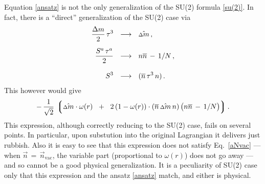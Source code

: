 \documentclass[12pt]{article}
\newcommand{\ov}{\overline}
\newcommand{\lgr}{\left\lgroup}
\newcommand{\rgr}{\right\rgroup}
\newcommand{\nbar}{\ov{n}}
\newcommand{\nnbar}{n\ov{n}}
\newcommand{\dm}{\hat{{\scriptstyle \Delta} m}}
\begin{document}
	Equation \eqref{ansatz} is not the only generalization of the SU(2) formula \eqref{su(2)}.
	In fact, there is a ``direct'' generalization of the SU(2) case via
\begin{align}
%
\notag
	\frac{\Delta m}{2}\, \tau^3    & ~~\longrightarrow~~    \dm\,,\\[2mm]
%
	\frac{S^a\, \tau^a}{2}    & ~~\longrightarrow~~    \nnbar \,-\, 1/N \,,\\[3mm]
%
\notag
	S^3    & ~~\longrightarrow~~     (\nbar\, \tau^3\, n)\,.
\end{align}
	This however would give
\[
	-\, \frac{1}{\sqrt{2}}\, \lgr  \dm \cdot \omega(r)  \;~+~\;  
	2\, ( 1 - \omega(r) ) \cdot (\nbar\, \dm\, n) \, \big( \nnbar \,-\, 1/N \big) \rgr.
\]
	This expression, although correctly reducing to the SU(2) case, fails on several points.
	In particular, upon substution into the original Lagrangian it delivers just rubbish.
	Also it is easy to see that this expression does not satisfy Eq.~\eqref{aNvac} ---
	when $ \vec{n} \,=\, \vec{n}_\text{vac} $, the variable part (proportional to $ \omega(r) $) does not go away ---
	and so cannot be a good physical generalization.
	It is a peculiarity of SU(2) case only that this expression and the ansatz \eqref{ansatz} match, and 
	either is physical.
\end{document}
